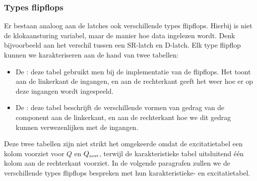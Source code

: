 \subsubsection{Types flipflops}
\label{sss:typesFlipflops}
Er bestaan analoog aan de latches ook verschillende types flipflops. Hierbij is niet de klokaansturing variabel, maar de manier hoe data ingelezen wordt. Denk bijvoorbeeld aan het verschil tussen een SR-latch en D-latch. Elk type flipflop kunnen we karakteriseren aan de hand van twee tabellen:
\begin{itemize}
 \item De : deze tabel gebruikt men bij de implementatie van de flipflops. Het toont aan de linkerkant de ingangen, en aan de rechterkant geeft het weer hoe er op deze ingangen wordt ingespeeld. 
 \item De : deze tabel beschrijft de verschillende vormen van gedrag van de component aan de linkerkant, en aan de rechterkant hoe we dit gedrag kunnen verwezenlijken met de ingangen.
\end{itemize}
Deze twee tabellen zijn niet strikt het omgekeerde omdat de excitatietabel een kolom voorziet voor $Q$ en $Q_{\mbox{\tiny{next}}}$, terwijl de karakteristieke tabel uitsluitend \'e\'en kolom aan de rechterkant voorziet. In de volgende paragrafen zullen we de verschillende types flipflops bespreken met hun karakteristieke- en excitatietabel.
